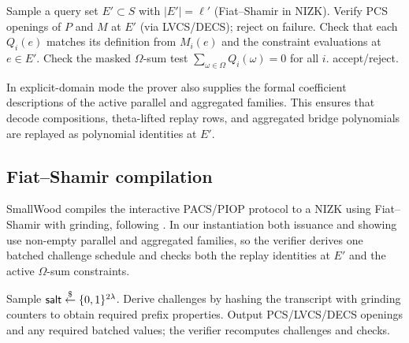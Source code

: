 \begin{algorithm}[H]
\caption{\textsf{PACS.PIOPOpenAndCheck}(\(\textsf{pcsCom},Q\)) (verifier)}
\label{alg:pacs-openandcheck}
\begin{algorithmic}[1]
\State Sample a query set \(E'\subset S\) with \(|E'|=\ell'\) (Fiat--Shamir in NIZK).
\State Verify PCS openings of \(P\) and \(M\) at \(E'\) (via LVCS/DECS); reject on failure.
\State Check that each \(Q_i(e)\) matches its definition from \(M_i(e)\) and the constraint evaluations at \(e\in E'\).
\State Check the masked \(\Omega\)-sum test \(\sum_{\omega\in\Omega} Q_i(\omega)=0\) for all \(i\).
\State \Return accept/reject.
\end{algorithmic}
\end{algorithm}

In explicit-domain mode the prover also supplies the formal coefficient
descriptions of the active parallel and aggregated families. This ensures that
decode compositions, theta-lifted replay rows, and aggregated bridge
polynomials are replayed as polynomial identities at \(E'\).

\subsection{Fiat--Shamir compilation}
SmallWood compiles the interactive PACS/PIOP protocol to a NIZK using
Fiat--Shamir with grinding, following \cite{EPRINT:FenRiv25b}. In our
instantiation both issuance and showing use non-empty parallel and aggregated
families, so the verifier derives one batched challenge schedule and checks
both the replay identities at \(E'\) and the active \(\Omega\)-sum constraints.

\begin{algorithm}[H]
\caption{\textsf{PACS.ToNIZK} (Fiat--Shamir wrapper with grinding)}
\label{alg:pacs-tonizk}
\begin{algorithmic}[1]
\State Sample \(\textsf{salt}\overset{\$}{\leftarrow}\{0,1\}^{2\lambda}\).
\State Derive challenges by hashing the transcript with grinding counters to obtain required prefix properties.
\State Output PCS/LVCS/DECS openings and any required batched values; the verifier recomputes challenges and checks.
\end{algorithmic}
\end{algorithm}
